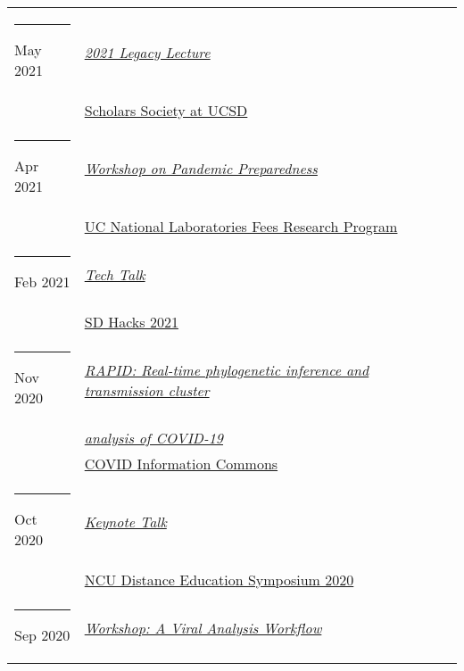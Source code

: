 \documentclass[margin,line]{res}
\begin{document}
\begin{resume}
\begin{longtable}{@{}p{0.7in}p{4in}}
\hspace*{-4mm} \rule{-1mm}{5mm} May 2021 & \href{https://studentorg.ucsd.edu/Home/Details/12340}{\textit{2021 Legacy Lecture}}\\*
\hspace*{-4mm} & \hspace{4mm} \href{https://studentorg.ucsd.edu/Home/Details/12340}{Scholars Society at UCSD}\\
\hspace*{-4mm} \rule{-1mm}{5mm} Apr 2021 & \href{https://www.ucop.edu/research-initiatives/programs/lab-fees/workshops.html}{\textit{Workshop on Pandemic Preparedness}}\\*
\hspace*{-4mm} & \hspace{4mm} \href{https://www.ucop.edu/research-initiatives/programs/lab-fees/index.html}{UC National Laboratories Fees Research Program}\\
\hspace*{-4mm} \rule{-1mm}{5mm} Feb 2021 & \href{https://www.sdhacks.io/}{\textit{Tech Talk}}\\*
\hspace*{-4mm} & \hspace{4mm} \href{https://www.sdhacks.io/}{SD Hacks 2021}\\
\hspace*{-4mm} \rule{-1mm}{5mm} Nov 2020 & \href{https://www.youtube.com/watch?v=6-fDbTY8ySI}{\textit{RAPID: Real-time phylogenetic inference and transmission cluster}}\\*
\hspace*{-4mm} & \hspace{4mm} \href{https://www.youtube.com/watch?v=6-fDbTY8ySI}{\textit{analysis of COVID-19}}\\*
\hspace*{-4mm} & \hspace{4mm} \href{https://covidinfocommons.datascience.columbia.edu/}{COVID Information Commons}\\
\hspace*{-4mm} \rule{-1mm}{5mm} Oct 2020 & \href{http://distance.ncu.edu.jm/proposal_submission}{\textit{Keynote Talk}}\\*
\hspace*{-4mm} & \hspace{4mm} \href{http://distance.ncu.edu.jm/proposal_submission}{NCU Distance Education Symposium 2020}\\
\hspace*{-4mm} \rule{-1mm}{5mm} Sep 2020 & \href{https://www.theopencode.org/a-viral-analysis-workflow/}{\textit{Workshop: A Viral Analysis Workflow}}\\*

\end{longtable}
\end{resume}
\end{document}
